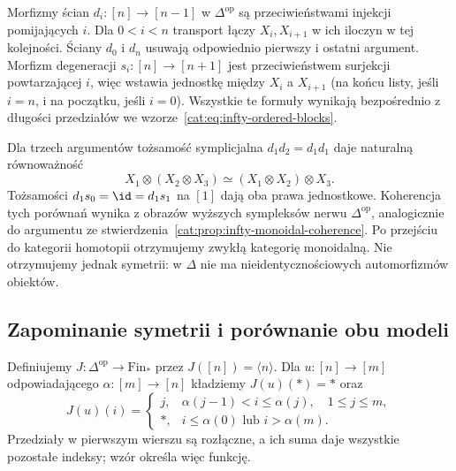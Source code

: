 \begin{przyklad}\label{cat:ex:infty-nonsymmetric-faces}
Morfizmy ścian $d_i:[n]\to[n-1]$ w $\Delta^{\mathrm{op}}$ są przeciwieństwami injekcji pomijających $i$. Dla $0<i<n$ transport łączy $X_i,X_{i+1}$ w ich iloczyn w tej kolejności. Ściany $d_0$ i $d_n$ usuwają odpowiednio pierwszy i ostatni argument. Morfizm degeneracji $s_i:[n]\to[n+1]$ jest przeciwieństwem surjekcji powtarzającej $i$, więc wstawia jednostkę między $X_i$ a $X_{i+1}$ (na końcu listy, jeśli $i=n$, i na początku, jeśli $i=0$). Wszystkie te formuły wynikają bezpośrednio z długości przedziałów we wzorze~\eqref{cat:eq:infty-ordered-blocks}.

Dla trzech argumentów tożsamość symplicjalna $d_1d_2=d_1d_1$ daje naturalną równoważność
\[
 X_1\otimes(X_2\otimes X_3)
 \simeq (X_1\otimes X_2)\otimes X_3.
\]
Tożsamości $d_1s_0=\id=d_1s_1$ na $[1]$ dają oba prawa jednostkowe. Koherencja tych porównań wynika z obrazów wyższych sympleksów nerwu $\Delta^{\mathrm{op}}$, analogicznie do argumentu ze stwierdzenia~\ref{cat:prop:infty-monoidal-coherence}. Po przejściu do kategorii homotopii otrzymujemy zwykłą kategorię monoidalną. Nie otrzymujemy jednak symetrii: w $\Delta$ nie ma nieidentycznościowych automorfizmów obiektów.
\end{przyklad}

\subsection{Zapominanie symetrii i porównanie obu modeli}

\begin{definicja}\label{cat:def:infty-delta-finpointed}
Definiujemy $J:\Delta^{\mathrm{op}}\to\mathrm{Fin}_*$ przez $J([n])=\langle n\rangle$. Dla $u:[n]\to[m]$ odpowiadającego $\alpha:[m]\to[n]$ kładziemy $J(u)(*)=*$ oraz
\[
 J(u)(i)=
 \begin{cases}
 j,&\alpha(j-1)<i\leq\alpha(j),\quad 1\leq j\leq m,\\
 *,&i\leq\alpha(0)\text{ lub }i>\alpha(m).
 \end{cases}
\]
Przedziały w pierwszym wierszu są rozłączne, a ich suma daje wszystkie pozostałe indeksy; wzór określa więc funkcję.
\end{definicja}


